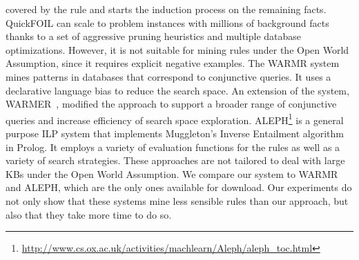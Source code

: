 covered by the rule and starts the induction process on the remaining facts.
QuickFOIL can scale to problem  instances with millions of background facts thanks to a
set of aggressive pruning heuristics and multiple database optimizations.
However, it is not suitable for mining rules under the Open World Assumption, since it requires explicit negative examples.
The WARMR system \cite{DehToi99,DehToi00} mines patterns in data\-bases that correspond to conjunctive queries. It uses a declarative language bias to reduce the search space.
An extension of the system, WARMER~\cite{GoeVan02}, modified the approach to support a broader range of conjunctive queries and increase efficiency of search space exploration.
ALEPH\footnote{\label{foot:aleph}\url{http://www.cs.ox.ac.uk/activities/machlearn/Aleph/aleph_toc.html}} is a general purpose ILP system that implements Muggleton's Inverse Entailment algorithm~\cite{Muggleton95inverseentailment} in Prolog.
It employs a variety of evaluation functions for the rules as well as a variety of search strategies.
These approaches are not tailored to deal with large KBs under the Open World Assumption.
We compare our system to WARMR and ALEPH, which are the only ones available for download.
Our experiments do not only show that these systems mine less sensible rules than our approach, but also that they take more time to do so.

